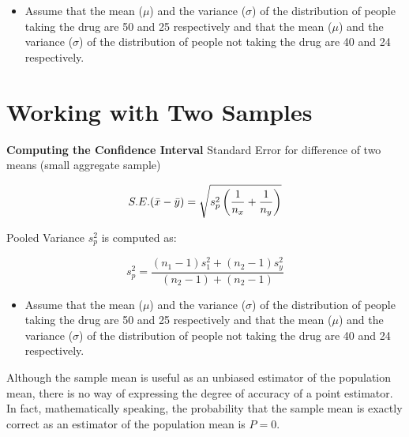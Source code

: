 \documentclass[]{report}
\begin{document}
\begin{itemize}
\item Assume that the mean ($\mu$) and the variance ($\sigma$) of the distribution
of people taking the drug are 50 and 25 respectively and that the mean ($\mu$)
and the variance ($\sigma$) of the distribution of people not taking the drug are
40 and 24 respectively.
\end{itemize}













\section{Working with Two Samples}




\textbf{Computing the Confidence Interval}
Standard Error for difference of two means (small aggregate sample)

\[ S.E.(\bar{x}-\bar{y}) = \sqrt{  s^2_p \left({1\over n_x}+{1\over n_y} \right)} \]

Pooled Variance $s^2_p$ is computed as:

\[ s^2_p = \frac{(n_1-1)s^2_1 + (n_2-1)s^2_y}{(n_2-1) + (n_2-1)} \]




\begin{itemize}
\item  Assume that the mean ($\mu$) and the variance ($\sigma$) of the distribution
of people taking the drug are 50 and 25 respectively and that the mean ($\mu$)
and the variance ($\sigma$) of the distribution of people not taking the drug are
40 and 24 respectively.
\end{itemize}






Although the sample mean is useful as an unbiased estimator of the population mean, there is no way of
expressing the degree of accuracy of a point estimator. In fact, mathematically speaking, the probability that the
sample mean is exactly correct as an estimator of the population mean is $P = 0$.
\end{document}
